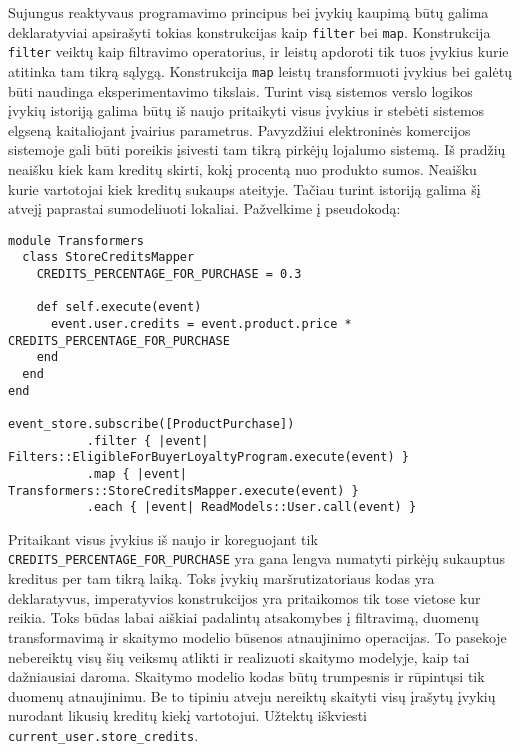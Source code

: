 Sujungus reaktyvaus programavimo principus bei įvykių kaupimą būtų galima deklaratyviai apsirašyti tokias konstrukcijas kaip \lstinline|filter| bei \lstinline|map|. Konstrukcija \lstinline|filter| veiktų kaip filtravimo operatorius, ir leistų apdoroti tik tuos įvykius kurie atitinka tam tikrą sąlygą. Konstrukcija \lstinline|map| leistų transformuoti įvykius bei galėtų būti naudinga eksperimentavimo tikslais. Turint visą sistemos verslo logikos įvykių istoriją galima būtų iš naujo pritaikyti visus įvykius ir stebėti sistemos elgseną kaitaliojant įvairius parametrus. Pavyzdžiui elektroninės komercijos sistemoje gali būti poreikis įsivesti tam tikrą pirkėjų lojalumo sistemą. Iš pradžių neaišku kiek kam kreditų skirti, kokį procentą nuo produkto sumos. Neaišku kurie vartotojai kiek kreditų sukaups ateityje. Tačiau turint istoriją galima šį atvejį paprastai sumodeliuoti lokaliai. Pažvelkime į pseudokodą:

\begin{lstlisting}[]
module Transformers
  class StoreCreditsMapper
    CREDITS_PERCENTAGE_FOR_PURCHASE = 0.3

    def self.execute(event)
      event.user.credits = event.product.price * CREDITS_PERCENTAGE_FOR_PURCHASE
    end
  end
end

event_store.subscribe([ProductPurchase])
           .filter { |event| Filters::EligibleForBuyerLoyaltyProgram.execute(event) }
           .map { |event| Transformers::StoreCreditsMapper.execute(event) }
           .each { |event| ReadModels::User.call(event) }
\end{lstlisting}

Pritaikant visus įvykius iš naujo ir koreguojant tik \lstinline|CREDITS_PERCENTAGE_FOR_PURCHASE| yra gana lengva numatyti pirkėjų sukauptus kreditus per tam tikrą laiką. Toks įvykių maršrutizatoriaus kodas yra deklaratyvus, imperatyvios konstrukcijos yra pritaikomos tik tose vietose kur reikia. Toks būdas labai aiškiai padalintų atsakomybes į filtravimą, duomenų transformavimą ir skaitymo modelio būsenos atnaujinimo operacijas. To pasekoje nebereiktų visų šių veiksmų atlikti ir realizuoti skaitymo modelyje, kaip tai dažniausiai daroma. Skaitymo modelio kodas būtų trumpesnis ir rūpintųsi tik duomenų atnaujinimu. Be to tipiniu atveju nereiktų skaityti visų įrašytų įvykių nurodant likusių kreditų kiekį vartotojui. Užtektų iškviesti \lstinline|current_user.store_credits|.


